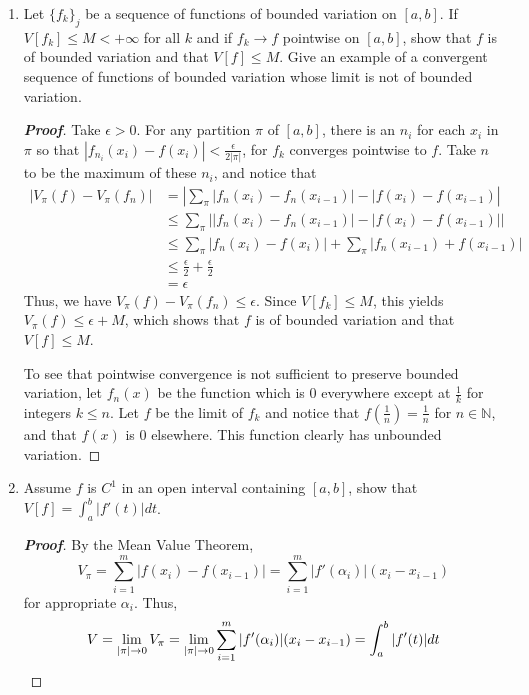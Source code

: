 \documentclass[12pt,leqno]{book}
\theoremstyle{definition}
\newenvironment{Proof}{\begin{proof}[\textnormal{\textbf{Proof}}]}{\end{proof}}
\begin{document}
\begin{enumerate}
\item Let $\{f_k\}_j$ be a sequence of functions of bounded variation on $[a,b]$. If $V[f_k]\leq M<+\infty$ for all $k$ and if $f_k\to f$ pointwise on $[a,b]$, show that $f$ is of bounded variation and that $V[f]\leq M$. Give an example of a convergent sequence of functions of bounded variation whose limit is not of bounded variation.

\begin{Proof}
 Take $\epsilon>0$. For any partition $\pi$ of $[a,b]$, there is an $n_i$ for each $x_i$ in $\pi$ so that $|f_{n_i}(x_i)-f(x_i)|<\frac{\epsilon}{2|\pi|}$, for $f_k$ converges pointwise to $f$. Take $n$ to be the maximum of these $n_i$, and notice that \begin{align*}|V_{\pi}(f)-V_{\pi}(f_n)|&=\left|\sum_{\pi}|f_n(x_i)-f_n(x_{i-1})|-|f(x_i)-f(x_{i-1})\right|\\&\leq\sum_{\pi}\Big||f_n(x_i)-f_n(x_{i-1})|-|f(x_i)-f(x_{i-1})|\Big|\\&\leq\sum_{\pi}|f_n(x_i)-f(x_i)|+\sum_{\pi}|f_n(x_{i-1})+f(x_{i-1})|\\&\leq\frac{\epsilon}{2}+\frac{\epsilon}{2}\\&=\epsilon\end{align*} Thus, we have $V_{\pi}(f)-V_{\pi}(f_n)\leq\epsilon$. Since $V[f_k]\leq M$, this yields $V_{\pi}(f)\leq\epsilon+M$, which shows that $f$ is of bounded variation and that $V[f]\leq M$. 

To see that pointwise convergence is not sufficient to preserve bounded variation, let $f_n(x)$ be the function which is 0 everywhere except at $\frac{1}{k}$ for integers $k\leq n$. Let $f$ be the limit of $f_k$ and notice that $f(\frac{1}{n})=\frac{1}{n}$ for $n\in\mathbb{N}$, and that $f(x)$ is 0 elsewhere. This function clearly has unbounded variation.
\end{Proof}


\item Assume $f$ is $C^1$ in an open interval containing $[a,b]$, show that $V[f]=\int_a^b|f'(t)|dt$.
\begin{Proof}
 By the Mean Value Theorem, \[V_{\pi}=\sum_{i=1}^m|f(x_i)-f(x_{i-1})|=\sum_{i=1}^m|f'(\alpha_i)|(x_i-x_{i-1})\] for appropriate $\alpha_i$. Thus, \[V=\lim_{|\pi|\to0}V_{\pi}=\lim_{|\pi|\to0}\sum_{i=1}^m|f'(\alpha_i)|(x_i-x_{i-1})=\int_a^b|f'(t)|dt\qedhere\]
\end{Proof}

\end{enumerate}
\end{document}
